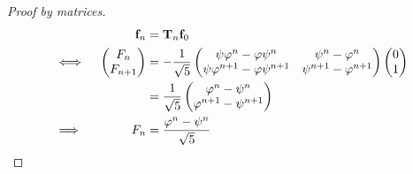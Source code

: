 \begin{proof}[Proof by matrices]
\begin{alignat*}
  &&\vec f_n &= \mat T_n \vec f_0 \\
  &\iff{}&
   \begin{pmatrix}
    F_n \\
    F_{n + 1}
   \end{pmatrix} &=
   -\frac 1 {\sqrt 5}
   \begin{pmatrix}
    \psi \varphi^n -\varphi \psi^n & \psi^n - \varphi^n \\
    \psi \varphi^{n + 1} - \varphi \psi^{n + 1} &
        \psi^{n + 1} - \varphi^{n + 1}
   \end{pmatrix}
   \begin{pmatrix}
    0 \\
    1
   \end{pmatrix} \\
  && &=
  \frac 1 {\sqrt 5}
   \begin{pmatrix}
    \varphi^n - \psi^n \\
    \varphi^{n + 1} - \psi^{n + 1}
   \end{pmatrix} \\
   &\implies{}& F_n &= \frac{\varphi^n - \psi^n}{\sqrt 5} \qedhere
 \end{alignat*}
\end{proof}

